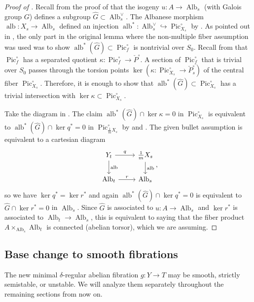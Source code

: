 \documentclass[reqno, letterpaper]{amsart}
\numberwithin{equation}{subsection}
\let\to\longrightarrow
\DeclareMathOperator{\Pic}{Pic}
\DeclareMathOperator{\Alb}{Alb}
\DeclareMathOperator{\alb}{alb}
\begin{document}
			\begin{proof}[Proof of ]
				Recall from the proof of  that the isogeny $u : A \to \Alb_s$ (with Galois group $G$) defines a subgroup $\hat G \subset \Alb_s^\vee$. The Albanese morphism $\alb : X_s \to \Alb_s$ defined an injection $\alb^* : \Alb_s^\vee \hookrightarrow \Pic^\circ_{X_s}$ by . As pointed out in , the only part in the original lemma where the non-multiple fiber assumption was used was to show $\alb^*(\hat G) \subset \Pic^\circ_f$ is nontrivial over $S_0$. Recall from  that $\Pic^\circ_f$ has a separated quotient $\kappa : \Pic^\circ_f \to \check P^\circ$. A section of $\Pic^\circ_f$ that is trivial over $S_0$ passes through the torsion points $\ker (\kappa : \Pic^\circ_{X_s} \to \check P^\circ_s)$ of the central fiber $\Pic^\circ_{X_s}$. Therefore, it is enough to show that $\alb^*(\hat G) \subset \Pic^\circ_{X_s}$ has a trivial intersection with $\ker \kappa \subset \Pic^\circ_{X_s}$.
				
				\medskip
				
				Take the diagram in . The claim $\alb^* (\hat G) \cap \ker \kappa = 0$ in $\Pic^\circ_{X_s}$ is equivalent to $\alb^* (\hat G) \cap \ker q^* = 0$ in $\Pic^\circ_{\frac{1}{m}X_s}$ by  and . The given bullet assumption is equivalent to a cartesian diagram
				\[\begin{tikzcd}
					Y_t \arrow[r, "q"] \arrow[d, "\alb"] & \tfrac{1}{m} X_s \arrow[d, "\alb"] \\
					\Alb_t \arrow[r, "r"] & \Alb_s
				\end{tikzcd},\]
				so we have $\ker q^* = \ker r^*$ and again $\alb^*(\hat G) \cap \ker q^* = 0$ is equivalent to $\hat G \cap \ker r^* = 0$ in $\Alb_s$. Since $\hat G$ is associated to $u : A \to \Alb_s$ and $\ker r^*$ is associated to $\Alb_t \to \Alb_s$, this is equivalent to saying that the fiber product $A \times_{\Alb_s} \Alb_t$ is connected (abelian torsor), which we are assuming.
			\end{proof}
			
			
			
	\subsection{Base change to smooth fibrations} \label{sec:base change to smooth}
		The new minimal $\delta$-regular abelian fibration $g : Y \to T$ may be smooth, strictly semistable, or unstable. We will analyze them separately throughout the remaining sections from now on.
		
\end{document}

